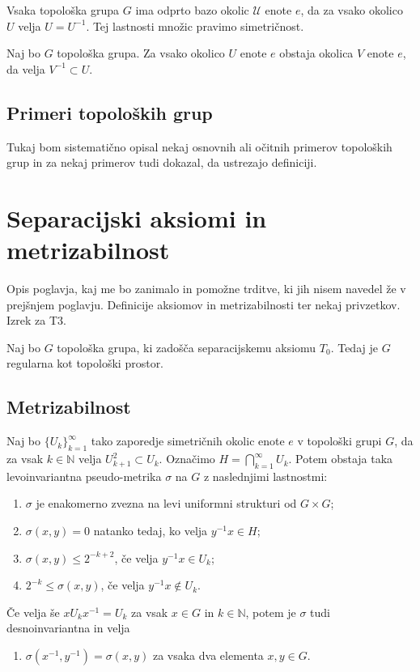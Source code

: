 \documentclass[mat1]{fmfdelo}
\newcommand{\N}{\mathbb N}
\newcommand{\Ucurl}{\mathcal{U}}
\begin{document}
\begin{trditev}
Vsaka topološka grupa $G$ ima odprto bazo okolic $\Ucurl$ enote $e$, da za vsako okolico $U$ velja $U = U^{-1}$. Tej lastnosti množic pravimo simetričnost.
\end{trditev}

\begin{posledica}\label{pos:sim}
Naj bo $G$ topološka grupa. Za vsako okolico $U$ enote $e$ obstaja okolica $V$ enote $e$, da velja $V^{-1} \subset U$.
\end{posledica}


\subsection{Primeri topoloških grup}
Tukaj bom sistematično opisal nekaj osnovnih ali očitnih primerov topoloških grup in za nekaj primerov tudi dokazal, da ustrezajo definiciji.

\section{Separacijski aksiomi in metrizabilnost}
Opis poglavja, kaj me bo zanimalo in pomožne trditve, ki jih nisem navedel že v prejšnjem poglavju.
Definicije aksiomov in metrizabilnosti ter nekaj privzetkov. Izrek za T3.

\begin{izrek}\label{izr:t3}
Naj bo $G$ topološka grupa, ki zadošča separacijskemu aksiomu $T_0$. Tedaj je $G$ regularna kot topološki prostor.
\end{izrek}

\subsection{Metrizabilnost}

\begin{izrek}\label{izr:pseudometrika}
Naj bo $\lbrace U_k \rbrace_{k = 1}^{\infty}$ tako zaporedje simetričnih okolic enote $e$ v topološki grupi $G$, da za vsak $k \in \N$ velja $U_{k+1}^2 \subset U_k$. Označimo $H = \bigcap_{k=1}^{\infty} U_k$. Potem obstaja taka levoinvariantna pseudo-metrika $\sigma$ na $G$ z naslednjimi lastnostmi:
\begin{enumerate}
\item $\sigma$ je enakomerno zvezna na levi uniformni strukturi od $G \times G$;
\item $\sigma (x, y) = 0$ natanko tedaj, ko velja $y^{-1}x \in H$;
\item $\sigma (x, y) \leq 2^{-k+2}$, če velja $y^{-1}x \in U_k$;
\item $2^{-k} \leq \sigma (x, y)$, če velja $y^{-1}x \notin U_k$.
\end{enumerate}

Če velja še $x U_k x^{-1} = U_k$ za vsak $x \in G$ in $k \in \N$, potem je $\sigma$ tudi desnoinvariantna in velja
\begin{enumerate}[resume]
\item $\sigma (x^{-1}, y^{-1}) = \sigma (x, y)$ za vsaka dva elementa $x, y \in G$.
\end{enumerate}
\end{izrek}
\end{document}
